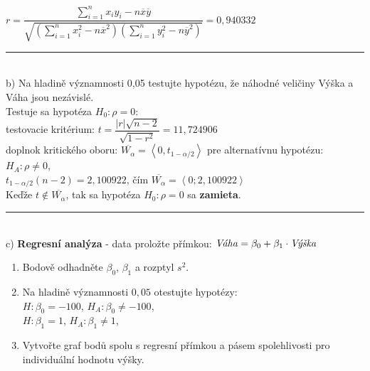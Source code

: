 \documentclass[pdftex, 11pt, a4paper, titlepage]{article}
\begin{document}
    \noindent
    $r = \dfrac{\sum\limits_{i=1}^{n}x_iy_i - n\overline{x}\overline{y}}{\sqrt{\left( \sum\limits_{i=1}^{n}x_i^2 - n\overline{x}^2 \right) \left( \sum\limits_{i=1}^{n}y_i^2 - n\overline{y}^2 \right)}} = 0,940332$\\

    \noindent\rule{\linewidth}{0.4pt}\\

    \noindent
    b) Na hladině významnosti 0,05 testujte hypotézu, že náhodné veličiny
    Výška a Váha jsou nezávislé.\\

    \noindent
    Testuje sa hypotéza $H_0 : \rho = 0$:\\
    testovacie kritérium: $t = \dfrac{|r|\sqrt{n-2}}{\sqrt{1-r^2}} = 11,724906$\\
    doplnok kritického oboru: $\overline{W_\alpha} = \left\langle 0,t_{1-\alpha/2} \right\rangle$ pre alternatívnu hypotézu: $H_A: \rho \neq 0$,\\
    $t_{1-\alpha/2}(n-2) = 2,100922$, čím $\overline{W_\alpha} = \left\langle 0;2,100922 \right\rangle$\\
    Keďže $t \notin \overline{W_\alpha}$, tak sa hypotéza $H_0 : \rho = 0$ sa \textbf{zamieta}.\\

    \noindent\rule{\linewidth}{0.4pt}\\

    \noindent
    c) \textbf{Regresní analýza} - data proložte přímkou: $\text{\emph{Váha}} = \beta_0 + \beta_1\cdot\text{\emph{Výška}}$
    \begin{enumerate}
        \item Bodově odhadněte $\beta_0$, $\beta_1$ a rozptyl $s^2$.
        \item Na hladině významnosti $0,05$ otestujte hypotézy:\\
            $H : \beta_0 = -100$, $H_A : \beta_0 \neq -100$,\\
            $H : \beta_1 = 1$, $H_A : \beta_1 \neq 1$,
        \item Vytvořte graf bodů spolu s regresní přímkou a pásem spolehlivosti pro individuální hodnotu výšky.\\
    \end{enumerate}
\end{document}
